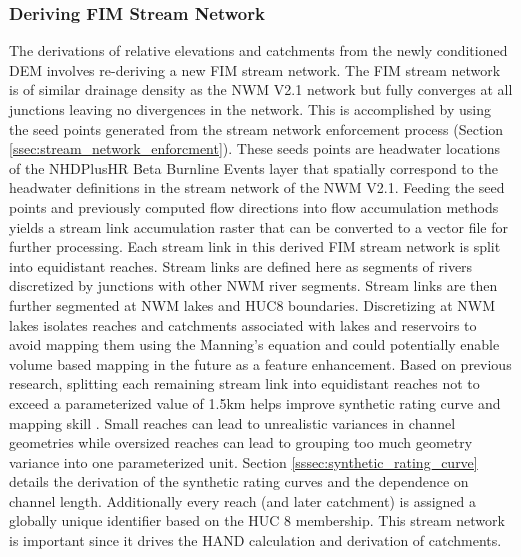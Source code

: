 \subsubsection{Deriving FIM Stream Network}
\label{sssec:deriving_fim_stream_network}
%
The derivations of relative elevations and catchments from the newly conditioned DEM involves re-deriving a new FIM stream network. 
The FIM stream network is of similar drainage density as the NWM V2.1 network but fully converges at all junctions leaving no divergences in the network.
This is accomplished by using the seed points generated from the stream network enforcement process (Section \ref{ssec:stream_network_enforcment}).
These seeds points are headwater locations of the NHDPlusHR Beta Burnline Events layer that spatially correspond to the headwater definitions in the stream network of the NWM V2.1.
Feeding the seed points and previously computed flow directions into flow accumulation methods \cite{wallis2009parallel,tarboton1997new,tarboton2005terrain} yields a stream link accumulation raster that can be converted to a vector file for further processing.
Each stream link in this derived FIM stream network is split into equidistant reaches.
Stream links are defined here as segments of rivers discretized by junctions with other NWM river segments.
Stream links are then further segmented at NWM lakes and HUC8 boundaries.
Discretizing at NWM lakes isolates reaches and catchments associated with lakes and reservoirs to avoid mapping them using the Manning's equation and could potentially enable volume based mapping in the future as a feature enhancement.
Based on previous research, splitting each remaining stream link into equidistant reaches not to exceed a parameterized value of 1.5km helps improve synthetic rating curve and mapping skill \cite{garousi2019terrain,godbout2019error,zheng2018geoflood}.
Small reaches can lead to unrealistic variances in channel geometries while oversized reaches can lead to grouping too much geometry variance into one parameterized unit.
Section \ref{sssec:synthetic_rating_curve} details the derivation of the synthetic rating curves and the dependence on channel length. 
Additionally every reach (and later catchment) is assigned a globally unique identifier based on the HUC 8 membership.
This stream network is important since it drives the HAND calculation and derivation of catchments.
%
